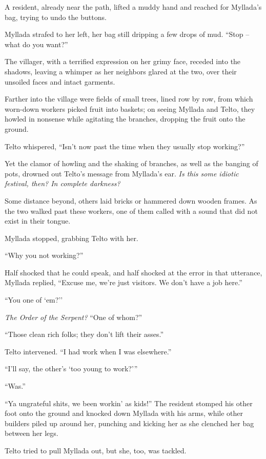 A resident, already near the path, lifted a muddy hand and reached for Myllada's bag, trying to undo the buttons.

Myllada strafed to her left, her bag still dripping a few drops of mud. ``Stop -- what do you want?''

The villager, with a terrified expression on her grimy face, receded into the shadows, leaving a whimper as her neighbors glared at the two, over their unsoiled faces and intact garments.

Farther into the village were fields of small trees, lined row by row, from which worn-down workers picked fruit into baskets; on seeing Myllada and Telto, they howled in nonsense while agitating the branches, dropping the fruit onto the ground.

Telto whispered, ``Isn't now past the time when they usually stop working?''

Yet the clamor of howling and the shaking of branches, as well as the banging of pots, drowned out Telto's message from Myllada's ear. \emph{Is this some idiotic festival, then? In complete darkness?}

Some distance beyond, others laid bricks or hammered down wooden frames. As the two walked past these workers, one of them called with a sound that did not exist in their tongue.

Myllada stopped, grabbing Telto with her.

``Why you not working?''

Half shocked that he could speak, and half shocked at the error in that utterance, Myllada replied, ``Excuse me, we're just visitors. We don't have a job here.''

``You one of `em?''

\emph{The Order of the Serpent?} ``One of whom?''

``Those clean rich folks; they don't lift their asses.''

Telto intervened. ``I had work when I was elsewhere.''

``I'll say, the other's `too young to work?'''

``Was.''

``Ya ungrateful shits, we been workin' as kids!'' The resident stomped his other foot onto the ground and knocked down Myllada with his arms, while other builders piled up around her, punching and kicking her as she clenched her bag between her legs.

Telto tried to pull Myllada out, but she, too, was tackled.

